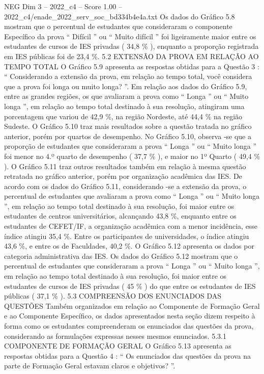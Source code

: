 \begin{textsample}{NEG Dim 3 – 2022\_c4 – Score 1.00 – 2022\_c4/enade\_2022\_serv\_soc\_bd334b4e4a.txt}
Os dados do Gráfico 5.8 mostram que o percentual de estudantes que consideraram o componente Específico da prova “ Difícil ” ou “ Muito difícil ” foi ligeiramente maior entre os estudantes de cursos de IES privadas ( 34,8 \% ), enquanto a proporção registrada em IES públicas foi de 23,4 \%. 5.2 EXTENSÃO DA PROVA EM RELAÇÃO AO TEMPO TOTAL O Gráfico 5.9 apresenta as respostas obtidas para a Questão 3 : “ Considerando a extensão da prova, em relação ao tempo total, você considera que a prova foi longa ou muito longa? ”.
Em relação aos dados do Gráfico 5.9, entre as grandes regiões, os que avaliaram a prova como “ Longa ” ou “ Muito longa ”, em relação ao tempo total destinado à sua resolução, atingiram uma porcentagem que variou de 42,9 \%, na região Nordeste, até 44,4 \% na região Sudeste.
O Gráfico 5.10 traz mais resultados sobre a questão tratada no gráfico anterior, porém por quartos de desempenho.
No Gráfico 5.10, observa -se que a proporção de estudantes que consideraram a prova “ Longa ” ou “ Muito longa ” foi menor no 4.º quarto de desempenho ( 37,7 \% ), e maior no 1º Quarto ( 49,4 \% ).
O Gráfico 5.11 traz outros resultados também em relação à mesma questão retratada no gráfico anterior, porém por organização acadêmica das IES.
De acordo com os dados do Gráfico 5.11, considerando -se a extensão da prova, o percentual de estudantes que avaliaram a prova como “ Longa ” ou “ Muito longa ”, em relação ao tempo total destinado à sua resolução, foi maior entre os estudantes de centros universitários, alcançando 43,8 \%, enquanto entre os estudantes de CEFET/IF, a organização acadêmica com a menor incidência, esse índice atingiu 35,4 \%.
Entre os participantes de universidades, o índice atingiu 43,6 \%, e entre os de Faculdades, 40,2 \%.
O Gráfico 5.12 apresenta os dados por categoria administrativa das IES.
Os dados do Gráfico 5.12 mostram que o percentual de estudantes que consideraram a prova “ Longa ” ou “ Muito longa ”, em relação ao tempo total destinado à sua resolução, foi maior entre os estudantes de cursos de IES privadas ( 45 \% ) do que entre os estudantes de IES públicas ( 37,1 \% ). 5.3 COMPREENSÃO DOS ENUNCIADOS DAS QUESTÕES Também organizados em relação ao Componente de Formação Geral e ao Componente Específico, os dados apresentados nesta seção dizem respeito à forma como os estudantes compreenderam os enunciados das questões da prova, considerando as formulações expressas nesses mesmos enunciados. 5.3.1 COMPONENTE DE FORMAÇÃO GERAL O Gráfico 5.13 apresenta as respostas obtidas para a Questão 4 : “ Os enunciados das questões da prova na parte de Formação Geral estavam claros e objetivos? ”.

\end{textsample}
